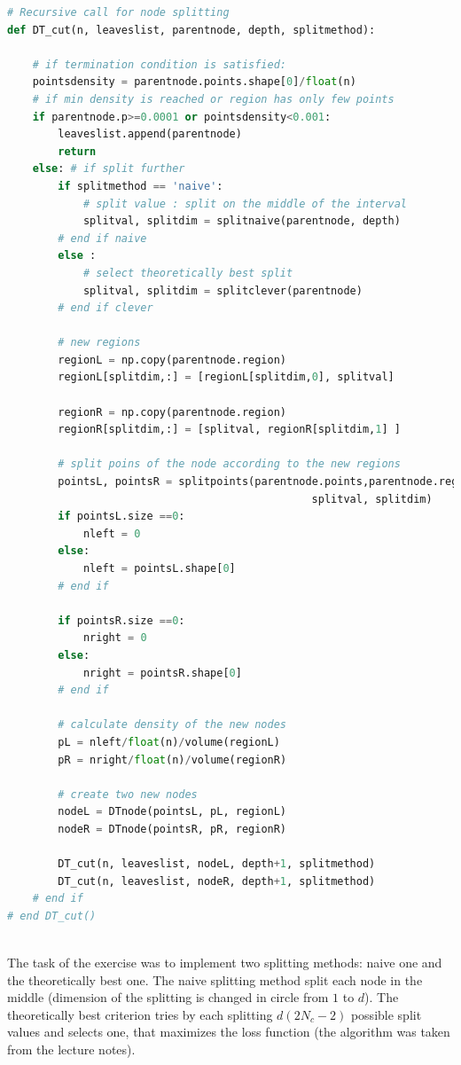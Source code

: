 \documentclass{article}
\begin{document}
\begin{lstlisting}[language=Python]
# Recursive call for node splitting
def DT_cut(n, leaveslist, parentnode, depth, splitmethod):

    # if termination condition is satisfied:    
    pointsdensity = parentnode.points.shape[0]/float(n)
    # if min density is reached or region has only few points 
    if parentnode.p>=0.0001 or pointsdensity<0.001: 
        leaveslist.append(parentnode)
        return
    else: # if split further
        if splitmethod == 'naive':
            # split value : split on the middle of the interval
            splitval, splitdim = splitnaive(parentnode, depth)
        # end if naive
        else :
            # select theoretically best split
            splitval, splitdim = splitclever(parentnode)            
        # end if clever   
        
        # new regions
        regionL = np.copy(parentnode.region)
        regionL[splitdim,:] = [regionL[splitdim,0], splitval]
        
        regionR = np.copy(parentnode.region)       
        regionR[splitdim,:] = [splitval, regionR[splitdim,1] ]           
        
        # split poins of the node according to the new regions
        pointsL, pointsR = splitpoints(parentnode.points,parentnode.region, \
                                                splitval, splitdim)
        if pointsL.size ==0:
            nleft = 0
        else:
            nleft = pointsL.shape[0]
        # end if    

        if pointsR.size ==0:
            nright = 0
        else:
            nright = pointsR.shape[0]
        # end if    
                
        # calculate density of the new nodes
        pL = nleft/float(n)/volume(regionL)
        pR = nright/float(n)/volume(regionR)        
        
        # create two new nodes        
        nodeL = DTnode(pointsL, pL, regionL)
        nodeR = DTnode(pointsR, pR, regionR)

        DT_cut(n, leaveslist, nodeL, depth+1, splitmethod)
        DT_cut(n, leaveslist, nodeR, depth+1, splitmethod)   
    # end if    
# end DT_cut()
    
\end{lstlisting}

The task of the exercise was to implement two splitting methods: naive one and the theoretically best one. 
The naive splitting method split each node in the middle (dimension of the splitting is changed in circle from $1$ to $d$). The theoretically best criterion tries by each splitting $d(2N_c-2)$ possible split values and selects one, that maximizes the loss function (the algorithm was taken from the lecture notes).
\end{document}
